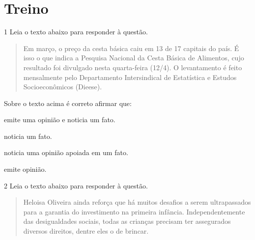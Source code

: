 
\section{Treino}

\num{1} Leia o texto abaixo para responder à questão.

\begin{quote}

Em março, o preço da cesta básica caiu em 13 de 17 capitais do país. É
isso o que indica a Pesquisa Nacional da Cesta Básica de Alimentos, cujo
resultado foi divulgado nesta quarta-feira (12/4). O levantamento é
feito mensalmente pelo Departamento Intersindical de Estatística e
Estudos Socioeconômicos (Dieese).

\end{quote}


Sobre o texto acima é correto afirmar que:

\begin{escolha}

  \item emite uma opinião e noticia um fato.

  \item noticia um fato. 

  \item noticia uma opinião apoiada em um fato.

  \item emite opinião. 

\end{escolha}


\num{2} Leia o texto abaixo para responder à questão. 

\begin{quote}

Heloisa Oliveira ainda reforça que há muitos desafios a serem ultrapassados para a garantia do investimento na primeira infância. Independentemente das desigualdades sociais, todas as crianças precisam ter assegurados diversos direitos, dentre eles o de brincar.

\end{quote}


